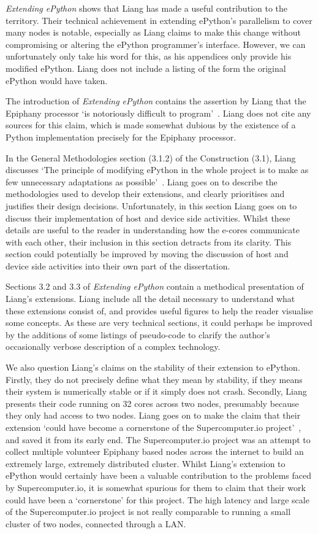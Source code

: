 \documentclass{report}[a4]
\begin{document}
 \textit{Extending ePython} shows that Liang has made a useful contribution to the territory. Their technical achievement in extending ePython's parallelism to cover many nodes is notable, especially as Liang claims to make this change without compromising or altering the ePython programmer's interface. However, we can unfortunately only take his word for this, as his appendices only provide his modified ePython. Liang does not include a listing of the form the original ePython would have taken.

 The introduction of \textit{Extending ePython} contains the assertion by Liang that the Epiphany processor `is  notoriously  difficult  to  program'~\cite{Liang2017}. Liang does not cite any sources for this claim, which is made somewhat dubious by the existence of a Python implementation precisely for the Epiphany processor.

 In the General Methodologies section (3.1.2) of the Construction (3.1), Liang discusses  `The principle of modifying ePython in the whole project is to make as few unnecessary adaptations as possible'~\cite{Liang2017}. Liang goes on to describe the methodologies used to develop their extensions, and clearly prioritises and justifies their design decisions. Unfortunately, in this section Liang goes on to  discuss their implementation of host and device side activities. Whilst these details are useful to the reader in understanding how the e-cores communicate with each other, their inclusion in this section detracts from its clarity. This section could potentially be improved by moving the discussion of host and device side activities into their own part of the dissertation.

 Sections 3.2 and 3.3 of \textit{Extending ePython} contain a methodical presentation of Liang's extensions. Liang include all the detail necessary to understand what these extensions consist of, and provides useful figures to help the reader visualise some concepts. As these are very technical sections, it could perhaps be improved by the additions of some listings of pseudo-code to clarify the author's occasionally verbose description of a complex technology.

 We also question Liang's claims on the stability of their extension to ePython. Firstly, they do not precisely define what they mean by stability, if they means their system is numerically stable or if it simply does not crash. Secondly, Liang presents their code running on 32 cores across two nodes, presumably because they only had access to two nodes. Liang goes on to make the claim that their extension `could have become a cornerstone of the Supercomputer.io project'~\cite{Liang2017}, and saved it from its early end. The Supercomputer.io project was an attempt to collect multiple volunteer Epiphany based nodes across the internet to build an extremely large, extremely distributed cluster. Whilst Liang's extension to ePython would certainly have been a valuable contribution to the problems faced by Supercomputer.io, it is somewhat spurious for them to claim that their work could have been a `cornerstone' for this project. The high latency and large scale of the Supercomputer.io project is not really comparable to running a small cluster of two nodes, connected through a LAN.
\end{document}
